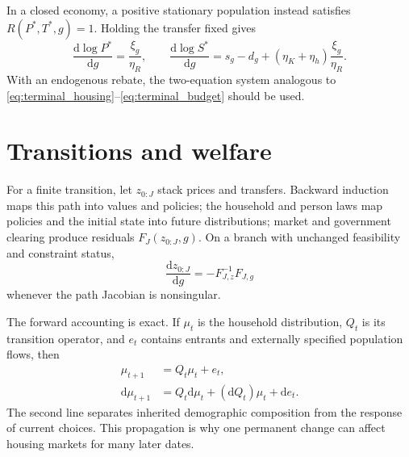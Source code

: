 \documentclass[11pt]{article}
\newcommand{\dd}{\mathrm{d}}
\begin{document}
In a closed economy, a positive stationary population instead satisfies
$R(P^*,T^*,g)=1$.  Holding the transfer fixed gives
\begin{equation}
 \frac{\dd\log P^*}{\dd g}=\frac{\xi_g}{\eta_R},
 \qquad
 \frac{\dd\log S^*}{\dd g}
 =s_g-d_g+(\eta_K+\eta_h)\frac{\xi_g}{\eta_R}.
 \label{eq:closed_economy_elasticities}
\end{equation}
With an endogenous rebate, the two-equation system analogous to
\eqref{eq:terminal_housing}--\eqref{eq:terminal_budget} should be used.

\section{Transitions and welfare}

For a finite transition, let $z_{0:J}$ stack prices and transfers.  Backward
induction maps this path into values and policies; the household and person
laws map policies and the initial state into future distributions; market and
government clearing produce residuals $F_J(z_{0:J},g)$.  On a branch with
unchanged feasibility and constraint status,
\begin{equation}
 \frac{\dd z_{0:J}}{\dd g}=-F_{J,z}^{-1}F_{J,g}
 \label{eq:transition_ift}
\end{equation}
whenever the path Jacobian is nonsingular.

The forward accounting is exact.  If $\mu_t$ is the household distribution,
$Q_t$ is its transition operator, and $e_t$ contains entrants and externally
specified population flows, then
\begin{align}
 \mu_{t+1}&=Q_t\mu_t+e_t,\\
 \dd\mu_{t+1}&=Q_t\dd\mu_t+(\dd Q_t)\mu_t+\dd e_t.
 \label{eq:distribution_derivative}
\end{align}
The second line separates inherited demographic composition from the response
of current choices.  This propagation is why one permanent change can affect
housing markets for many later dates.
\end{document}
